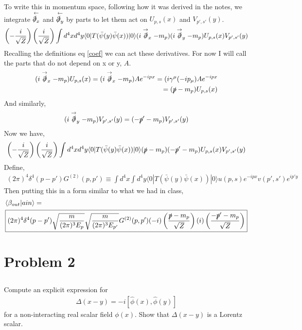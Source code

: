 \documentclass{article}
\numberwithin{equation}{section}
\newcommand{\pxb}{\bar{\psi}(x)}
\newcommand{\pyb}{\bar{\psi}(y)}
\newcommand{\beq}[1]{\begin{equation} \begin{aligned} #1 \end{aligned} \end{equation}}
\newcommand{\sqz}{\sqrt{Z}}
\newcommand{\intdfx}{\int d^4 x}
\newcommand{\intdfy}{\int d^4 y}
\newcommand{\bkt}[2]{\langle #1| #2  \rangle}
\newcommand{\bout}{\beta_{out}}
\newcommand{\brkt}[3]{\langle #1 | #2 | #3 \rangle}
\newcommand{\ups}{U_{p,s}(x)}
\newcommand{\vps}{V_{p',s'}(y)}
\newcommand{\rds}[1]{\stackrel{\rightarrow}{\slashed{\partial}}_{#1}}
\begin{document}
To write this in momentum space, following how it was derived in the notes, we integrate $\stackrel{\leftarrow}{\slashed{\partial}_x}$ and $\stackrel{\leftarrow}{\slashed{\partial}_y}$ by parts to let them act on $\ups$ and $\vps$.
\beq{
    \left(- \frac{i}{\sqz}\right) \left(\frac{i}{\sqz}\right) \intdfx d^4y \brkt{0}{T(\pyb \pxb)}{0}(i \rds{x} - m_p) (i \rds{y} - m_p) \ups \vps
}
Recalling the definitions eq \ref{coef} we can act these derivatives. For now I will call the parts that do not depend on x or y, $A$.
\beq{
    (i \rds{x} -m_p)\ups = (i \rds{x} - m_p) A e^{-ipx} = (i \gamma^\mu(-ip_\mu) A e^{-ipx} \\
    = (\slashed{p} - m_p) \ups
}
And similarly,
\beq{
    (i \rds{y} - m_p)\vps = (- \slashed{p}' - m_p) \vps
}
Now we have,
\beq{
    \left(- \frac{i}{\sqz}\right) \left(\frac{i}{\sqz}\right) \intdfx d^4y \brkt{0}{T(\pyb \pxb)}{0}(\slashed{p} - m_p) (-\slashed{p}' - m_p) \ups \vps
}
Define,
\beq{
    (2\pi)^4 \delta^4(p-p') G^{(2)}(p,p') \equiv 
    \intdfx \intdfy \brkt{0}{T(\pyb \pxb)}{0} u(p,s)e^{-ipx} v(p',s') e^{ip'y} 
}
Then putting this in a form similar to what we had in class,
\beq{
    &\bkt{\bout}{ain} = \\
    &\boxed{(2\pi)^4 \delta^4(p-p') \sqrt{\frac{m}{(2\pi)^3 E_p}} \sqrt{\frac{m}{(2\pi)^3 E_{p'}}} G^{(2)}(p,p') (-i) \left( \frac{\slashed{p}-m_p}{\sqz}  \right)
    (i)\left(  \frac{-\slashed{p}'-m_p}{\sqz} \right) }
}
\section{Problem 2}

\newcommand{\intkk}{\int \frac{d \vec{k} d \vec{k'}}            {(2\pi)^3 2 \sqrt{\omega_k \omega_{k'}}}}
\newcommand{\intk}{\int \frac{d \vec{k}}{(2\pi)^3 2 \omega_k}}

\newcommand{\ak}{\hat{a}(k)}
\newcommand{\akp}{\hat{a}(k')}
\newcommand{\akd}{\hat{a}(k)^{\dagger}}
\newcommand{\akpd}{\hat{a}(k')^{\dagger}}

\newcommand{\phix}{\hat{\phi}(x)}
\newcommand{\phiy}{\hat{\phi}(y)}

\newcommand{\phinx}{\phi_{in}(x)}
\newcommand{\phiny}{\phi_{in}(y)}

\subsection{}
Compute an explicit expression for 
\beq{
    \Delta (x-y) = -i [\phix, \phiy]
}
for a non-interacting real scalar field $\phi(x)$. Show that $\Delta (x-y)$ is a Lorentz scalar.
\end{document}
